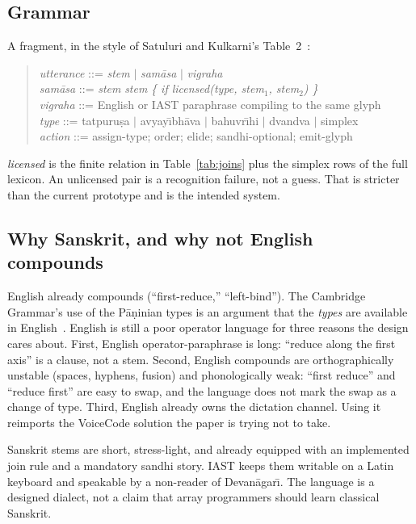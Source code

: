 \documentclass[manuscript, review, anonymous]{acmart}
\begin{document}
\subsection{Grammar}

A fragment, in the style of Satuluri and Kulkarni's Table~2~\cite{Satuluri2013Generation}:

\begin{quote}
\small
\textit{utterance} ::= \textit{stem} $\mid$ \textit{sam{\=a}sa} $\mid$ \textit{vigraha}\\
\textit{sam{\=a}sa} ::= \textit{stem} \textit{stem}  \quad\textit{\{ if licensed(type, stem$_1$, stem$_2$) \}}\\
\textit{vigraha} ::= English or IAST paraphrase compiling to the same glyph\\
\textit{type} ::= tatpuru{\d{s}}a $\mid$ avyay{\=\i}bh{\=a}va $\mid$ bahuvr{\=\i}hi $\mid$ dvandva $\mid$ simplex\\
\textit{action} ::= assign-type; order; elide; sandhi-optional; emit-glyph
\end{quote}

\textit{licensed} is the finite relation in Table~\ref{tab:joins} plus the simplex rows of the full lexicon. An unlicensed pair is a recognition failure, not a guess. That is stricter than the current prototype and is the intended system.

\subsection{Why Sanskrit, and why not English compounds}

English already compounds (``first-reduce,'' ``left-bind''). The Cambridge Grammar's use of the P{\=a}{\d{n}}inian types is an argument that the \emph{types} are available in English~\cite{Huddleston2002Cambridge}. English is still a poor operator language for three reasons the design cares about. First, English operator-paraphrase is long: ``reduce along the first axis'' is a clause, not a stem. Second, English compounds are orthographically unstable (spaces, hyphens, fusion) and phonologically weak: ``first reduce'' and ``reduce first'' are easy to swap, and the language does not mark the swap as a change of type. Third, English already owns the dictation channel. Using it reimports the VoiceCode solution the paper is trying not to take.

Sanskrit stems are short, stress-light, and already equipped with an implemented join rule and a mandatory sandhi story. IAST keeps them writable on a Latin keyboard and speakable by a non-reader of Devan{\=a}gar{\=\i}. The language is a designed dialect, not a claim that array programmers should learn classical Sanskrit.
\end{document}
